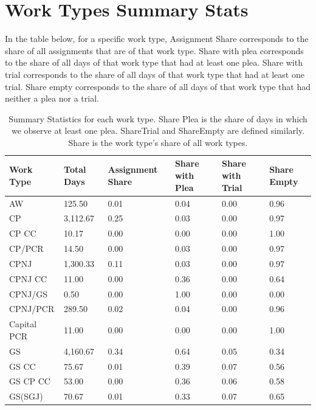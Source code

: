 \documentclass[11pt]{article}
\begin{document}
\section{Work Types Summary Stats}
  In the table below, for a specific work type, Assignment Share corresponds to the share of all assignments that are of that work type. Share with plea corresponds to the share of all days of that work type that had at least one plea. Share with trial corresponds to the share of all days of that work type that had at least one trial. Share empty corresponds to the share of all days of that work type that had neither a plea nor a trial.
  \begin{table}[H]
    \centering
    \small
    \caption{Summary Statistics for each work type. Share Plea is the share of days in which we observe at least one plea. ShareTrial and ShareEmpty are defined similarly. Share is the work type's share of all work types.}
    \label{tab:my-table}
    \begin{tabular}{|l|l|l|l|l|l|}
    \hline
    \textbf{Work Type} & \textbf{Total Days} & \textbf{Assignment Share} & \textbf{Share with Plea} & \textbf{Share with Trial} & \textbf{Share Empty} \\ \hline
    AW          & 125.50   & 0.01 & 0.04 & 0.00 & 0.96 \\ \hline
    CP          & 3,112.67 & 0.25 & 0.03 & 0.00 & 0.97 \\ \hline
    CP CC       & 10.17    & 0.00 & 0.00 & 0.00 & 1.00 \\ \hline
    CP/PCR      & 14.50    & 0.00 & 0.03 & 0.00 & 0.97 \\ \hline
    CPNJ        & 1,300.33 & 0.11 & 0.03 & 0.00 & 0.97 \\ \hline
    CPNJ CC     & 11.00    & 0.00 & 0.36 & 0.00 & 0.64 \\ \hline
    CPNJ/GS     & 0.50     & 0.00 & 1.00 & 0.00 & 0.00 \\ \hline
    CPNJ/PCR    & 289.50   & 0.02 & 0.04 & 0.00 & 0.96 \\ \hline
    Capital PCR & 11.00    & 0.00 & 0.00 & 0.00 & 1.00 \\ \hline
    GS          & 4,160.67 & 0.34 & 0.64 & 0.05 & 0.34 \\ \hline
    GS CC       & 75.67    & 0.01 & 0.39 & 0.07 & 0.56 \\ \hline
    GS CP CC    & 53.00    & 0.00 & 0.36 & 0.06 & 0.58 \\ \hline
    GS(SGJ)     & 70.67    & 0.01 & 0.33 & 0.07 & 0.65 \\ \hline

\end{tabular}
\end{table}
\end{document}

